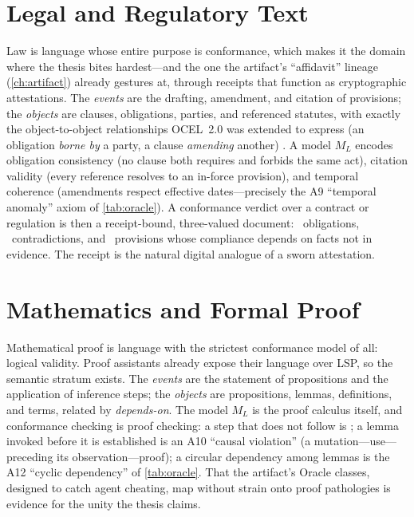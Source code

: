 \section{Legal and Regulatory Text}
\label{sec:al-legal}

Law is language whose entire purpose is conformance, which makes it the domain
where the thesis bites hardest---and the one the artifact's ``affidavit'' lineage
(\cref{ch:artifact}) already gestures at, through receipts that function as
cryptographic attestations. The \emph{events} are the drafting, amendment, and
citation of provisions; the \emph{objects} are clauses, obligations, parties, and
referenced statutes, with exactly the object-to-object relationships OCEL~2.0 was
extended to express (an obligation \emph{borne by} a party, a clause
\emph{amending} another) \citep{ocel2-2024}. A model $M_L$ encodes obligation
consistency (no clause both requires and forbids the same act), citation validity
(every reference resolves to an in-force provision), and temporal coherence
(amendments respect effective dates---precisely the A9 ``temporal anomaly'' axiom
of \cref{tab:oracle}). A conformance verdict over a contract or regulation is
then a receipt-bound, three-valued document: \admitted\ obligations, \
contradictions, and \unknownstat\ provisions whose compliance depends on facts
not in evidence. The receipt is the natural digital analogue of a sworn
attestation.

\section{Mathematics and Formal Proof}
\label{sec:al-math}

Mathematical proof is language with the strictest conformance model of all:
logical validity. Proof assistants already expose their language over LSP, so the
semantic stratum exists. The \emph{events} are the statement of propositions and
the application of inference steps; the \emph{objects} are propositions, lemmas,
definitions, and terms, related by \emph{depends-on}. The model $M_L$ is the
proof calculus itself, and conformance checking is proof checking: a step that
does not follow is \refused; a lemma invoked before it is established is an A10
``causal violation'' (a mutation---use---preceding its observation---proof); a
circular dependency among lemmas is the A12 ``cyclic dependency'' of
\cref{tab:oracle}. That the artifact's Oracle classes, designed to catch agent
cheating, map without strain onto proof pathologies is evidence for the unity the
thesis claims.

